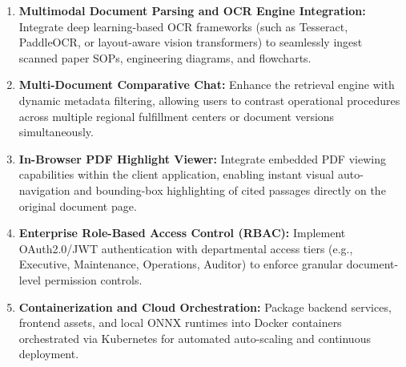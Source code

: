 \begin{enumerate}
    \item \textbf{Multimodal Document Parsing and OCR Engine Integration:} Integrate deep learning-based OCR frameworks (such as Tesseract, PaddleOCR, or layout-aware vision transformers) to seamlessly ingest scanned paper SOPs, engineering diagrams, and flowcharts.
    \item \textbf{Multi-Document Comparative Chat:} Enhance the retrieval engine with dynamic metadata filtering, allowing users to contrast operational procedures across multiple regional fulfillment centers or document versions simultaneously.
    \item \textbf{In-Browser PDF Highlight Viewer:} Integrate embedded PDF viewing capabilities within the client application, enabling instant visual auto-navigation and bounding-box highlighting of cited passages directly on the original document page.
    \item \textbf{Enterprise Role-Based Access Control (RBAC):} Implement OAuth2.0/JWT authentication with departmental access tiers (e.g., Executive, Maintenance, Operations, Auditor) to enforce granular document-level permission controls.
    \item \textbf{Containerization and Cloud Orchestration:} Package backend services, frontend assets, and local ONNX runtimes into Docker containers orchestrated via Kubernetes for automated auto-scaling and continuous deployment.
\end{enumerate}
